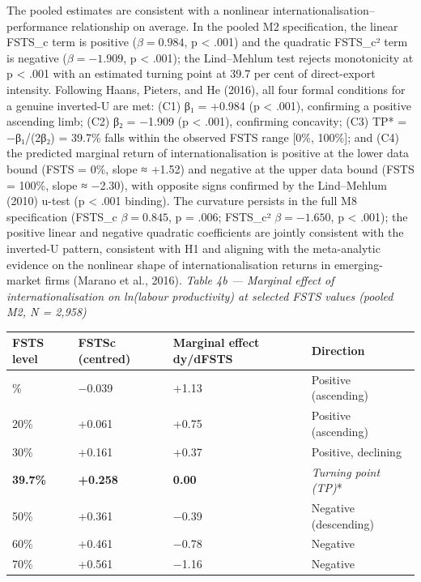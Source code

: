 \documentclass[12pt,a4paper]{article}
\begin{document}
The pooled estimates are consistent with a nonlinear
internationalisation--performance relationship on average. In the pooled
M2 specification, the linear FSTS\_c term is positive
(\(\beta = 0.984\), p \textless{} .001) and the quadratic FSTS\_c² term
is negative (\(\beta = -1.909\), p \textless{} .001); the Lind--Mehlum
test rejects monotonicity at p \textless{} .001 with an estimated
turning point at 39.7 per cent of direct-export intensity. Following
Haans, Pieters, and He (2016), all four formal conditions for a genuine
inverted-U are met: (C1) β₁ = +0.984 (p \textless{} .001), confirming a
positive ascending limb; (C2) β₂ = −1.909 (p \textless{} .001),
confirming concavity; (C3) TP* = −β₁/(2β₂) = 39.7\% falls within the
observed FSTS range {[}0\%, 100\%{]}; and (C4) the predicted marginal
return of internationalisation is positive at the lower data bound (FSTS
= 0\%, slope ≈ +1.52) and negative at the upper data bound (FSTS =
100\%, slope ≈ −2.30), with opposite signs confirmed by the Lind--Mehlum
(2010) u-test (p \textless{} .001 binding). The curvature persists in
the full M8 specification (FSTS\_c \(\beta = 0.845\), p = .006; FSTS\_c²
\(\beta = -1.650\), p \textless{} .001); the positive linear and
negative quadratic coefficients are jointly consistent with the
inverted-U pattern, consistent with H1 and aligning with the
meta-analytic evidence on the nonlinear shape of internationalisation
returns in emerging-market firms (Marano et al., 2016). \emph{Table 4b
--- Marginal effect of internationalisation on ln(labour productivity)
at selected FSTS values (pooled M2, N = 2,958)}

\begin{longtable}[]{@{}llll@{}}
\toprule\noalign{}
FSTS level & FSTSc (centred) & Marginal effect dy/dFSTS & Direction \\
\midrule\noalign{}
\endhead
\bottomrule\noalign{}
\endlastfoot
10\% & −0.039 & +1.13 & Positive (ascending) \\
20\% & +0.061 & +0.75 & Positive (ascending) \\
30\% & +0.161 & +0.37 & Positive, declining \\
\textbf{39.7\%} & \textbf{+0.258} & \textbf{0.00} & \emph{\emph{Turning
point (TP})}* \\
50\% & +0.361 & −0.39 & Negative (descending) \\
60\% & +0.461 & −0.78 & Negative \\
70\% & +0.561 & −1.16 & Negative \\
\end{longtable}
\end{document}
